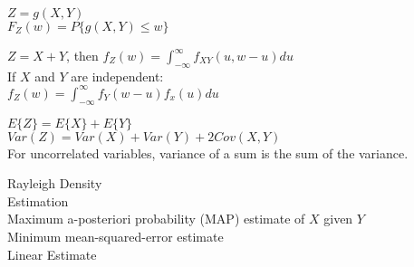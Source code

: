 $Z=g(X,Y)$ \\
$F_Z(w)=P\{g(X,Y) \leq w \}$

$Z=X+Y$, then $f_Z(w)=\int_{-\infty}^{\infty}f_{XY}(u, w-u)du$ \\
If $X$ and $Y$ are independent: \\
$f_Z(w)=\int_{-\infty}^{\infty}f_Y(w-u)f_x(u)du$


$E\{Z\}=E\{X\}+E\{Y\}$ \\
$Var(Z)=Var(X)+Var(Y)+2Cov(X,Y)$ \\
For uncorrelated variables, variance of a sum is the sum of the variance.


Rayleigh Density \\
Estimation \\
Maximum a-posteriori probability (MAP) estimate of $X$ given $Y$ \\
Minimum mean-squared-error estimate \\
Linear Estimate \\




    

